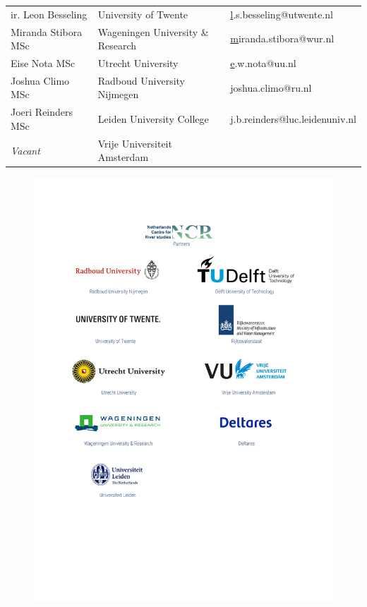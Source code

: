 \begin{longtable}{@{}lll@{}}
\rowcolor[HTML]{B9C6D5} 
ir. Leon Besseling                     & University of Twente                                  & {\color[HTML]{0563C1} {\ul l.s.besseling@utwente.nl}}        \\
\rowcolor[HTML]{C9D6D6} 
Miranda Stibora MSc                & Wageningen   University \& Research                   & {\color[HTML]{0563C1} {\ul miranda.stibora@wur.nl}}       \\
\rowcolor[HTML]{B9C6D5} 
Eise Nota MSc                          & Utrecht University                                    & {\color[HTML]{0563C1} {\ul e.w.nota@uu.nl}}                  \\
\rowcolor[HTML]{C9D6D6} 
Joshua Climo MSc                       & Radboud University   Nijmegen                         & {\color[HTML]{0563C1} {\ul joshua.climo@ru.nl}}              \\
\rowcolor[HTML]{B9C6D5} 
Joeri Reinders MSc                     & Leiden University   College                           & {\color[HTML]{0563C1} {\ul j.b.reinders@luc.leidenuniv.nl}}  \\
\rowcolor[HTML]{C9D6D6} 
\textit{Vacant}                        & Vrije Universiteit   Amsterdam                        & {\color[HTML]{0563C1} {\ul }}                                                  

\end{longtable}


\begin{figure}
\centering
\includegraphics[width=\textwidth]{figures/ncr_partners.png}
\end{figure}{}